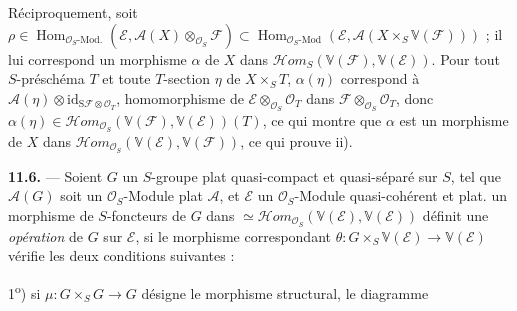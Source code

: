 \documentclass[11pt,a4paper]{article}
\begin{document}
Réciproquement, soit
$\rho \in \operatorname{Hom}_{\mathcal{O}_{S}\text{-Mod.}}
(\mathcal{E}, \mathcal{A}(X) \otimes_{\mathcal{O}_{S}} \mathcal{F})
\subset \operatorname{Hom}_{\mathcal{O}_{S}\text{-Mod}}
(\mathcal{E}, \mathcal{A}(X \times_{S} \mathbb{V}(\mathcal{F})))$ ; il lui
correspond un morphisme $\alpha$ de $X$ dans
$\mathcal{H}om_{S}(\mathbb{V}(\mathcal{F}), \mathbb{V}(\mathcal{E}))$.
Pour tout $S$-préschéma $T$ et toute $T$-section $\eta$ de
$X \times_{S} T$, $\alpha(\eta)$ correspond à
$\mathcal{A}(\eta) \otimes
\mathrm{id}_{\mathrm{S}\mathcal{F} \otimes \mathcal{O}_{T}}$,
homomorphisme de
$\mathcal{E} \otimes_{\mathcal{O}_{S}} \mathcal{O}_{T}$ dans
$\mathcal{F} \otimes_{\mathcal{O}_{S}} \mathcal{O}_{T}$, donc
$\alpha(\eta) \in
\mathcal{H}om_{\mathcal{O}_{S}}(\mathbb{V}(\mathcal{F}), \mathbb{V}(\mathcal{E}))(T)$,
ce qui montre que $\alpha$ est un morphisme de $X$ dans
$\mathcal{H}om_{\mathcal{O}_{S}}(\mathbb{V}(\mathcal{E}), \mathbb{V}(\mathcal{F}))$,
ce qui prouve ii).

\struck{\ill{}}

\textbf{11.6.} — Soient $G$ un $S$-groupe plat quasi-compact et
quasi-séparé sur $S$, tel que $\mathcal{A}(G)$ soit un
$\mathcal{O}_{S}$-Module plat $\mathcal{A}$, et $\mathcal{E}$ un
$\mathcal{O}_{S}$-Module quasi-cohérent et plat.
un morphisme de $S$-foncteurs de
$G$ dans
\struck{\ill{}} $\simeq
\mathcal{H}om_{\mathcal{O}_{S}}(\mathbb{V}(\mathcal{E}), \mathbb{V}(\mathcal{E}))$
définit une \emph{opération} de $G$ sur $\mathcal{E}$, si  le morphisme correspondant
$\theta : G \times_{S} \mathbb{V}(\mathcal{E}) \longrightarrow
\mathbb{V}(\mathcal{E})$ vérifie les deux conditions suivantes :

1\textsuperscript{o}) si $\mu : G \times_{S} G \longrightarrow G$ désigne le
morphisme structural, le diagramme

\end{document}
